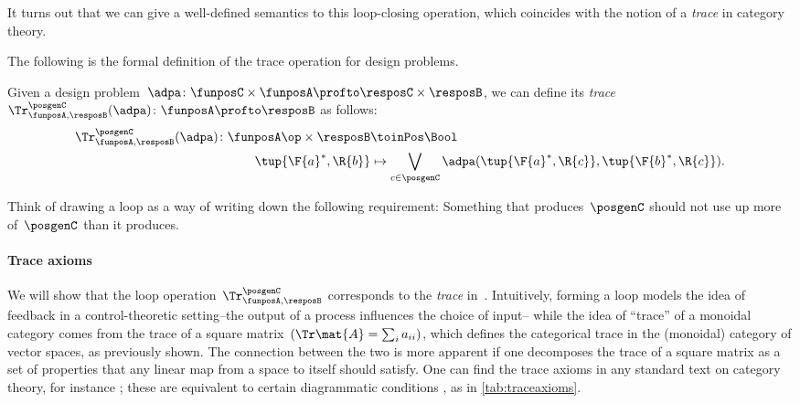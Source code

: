 It turns out that we can give a well-defined semantics to this loop-closing operation, which coincides with the notion of a \emph{trace} in category theory.

The following is the formal definition of the trace operation for design problems.


\begin{definition}
    \label{def:dp-trace}
    Given a design problem~$\adpa\colon \funposC \times \funposA \profto \resposC \times \resposB$, we can define
    its \emph{trace}~$\Tr_{\funposA,\resposB}^\posgenC(\adpa) \colon \funposA \profto \resposB$ as follows:
%
    \begin{equation}
        \label{eq:tracedef}
        \begin{aligned}
            \Tr_{\funposA,\resposB}^\posgenC(\adpa) \colon  \funposA\op \times \resposB &\toinPos \Bool \\
            \tup{\F{a}^*, \R{b}} &\mapsto \bigvee_{c\in \posgenC}
            \adpa(\tup{\F{a}^*, \R{c}},
            \tup{\F{b}^*, \R{c}}).
        \end{aligned}
    \end{equation}
\end{definition}


Think of drawing a loop as a way of writing down the following requirement: Something that produces~$\posgenC$ should not use up more of~$\posgenC$ than it produces.

\paragraph{Trace axioms}
We will show that the loop operation~$\Tr_{\funposA,\resposB}^\posgenC$ corresponds to the \emph{trace} in~\DP.
Intuitively, forming a loop models the idea of feedback in a control-theoretic setting--the output of a process influences the choice of input--
while the idea of ``trace'' of a monoidal category comes from the trace of a square matrix~$(\Tr\mat{A} = \sum_i a_{ii})$, which defines the categorical trace in the (monoidal) category of vector spaces, as previously shown.
The connection between the two is more apparent if one decomposes the trace of a square matrix as a set of properties that any linear map from a space to itself should satisfy. One can find the trace axioms in any standard text on category theory, for instance  \cite{mac2013categories};
these are equivalent to certain diagrammatic conditions \cite{joyal96}, as in \cref{tab:traceaxioms}.


